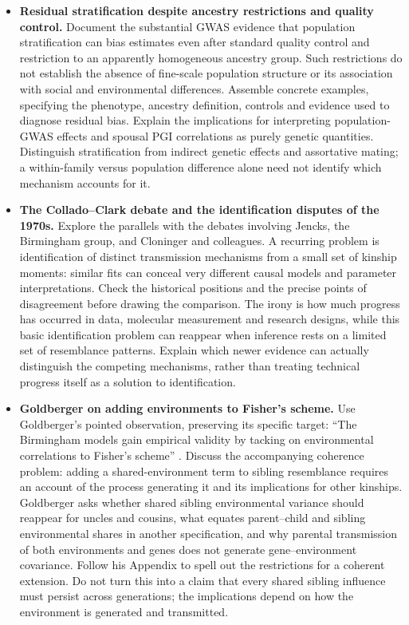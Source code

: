 \begin{itemize}
\item \textbf{Residual stratification despite ancestry restrictions and quality control.}
Document the substantial GWAS evidence that population stratification
can bias estimates even after standard quality control and restriction
to an apparently homogeneous ancestry group. Such restrictions do not
establish the absence of fine-scale population structure or its
association with social and environmental differences. Assemble concrete
examples, specifying the phenotype, ancestry definition, controls and
evidence used to diagnose residual bias. Explain the implications for
interpreting population-GWAS effects and spousal PGI correlations as
purely genetic quantities. Distinguish stratification from indirect
genetic effects and assortative mating; a within-family versus population
difference alone need not identify which mechanism accounts for it.

\item \textbf{The Collado--Clark debate and the identification disputes of the 1970s.}
Explore the parallels with the debates involving Jencks, the Birmingham
group, and Cloninger and colleagues. A recurring problem is identification
of distinct transmission mechanisms from a small set of kinship moments:
similar fits can conceal very different causal models and parameter
interpretations. Check the historical positions and the precise points
of disagreement before drawing the comparison. The irony is how much
progress has occurred in data, molecular measurement and research designs,
while this basic identification problem can reappear when inference rests
on a limited set of resemblance patterns. Explain which newer evidence
can actually distinguish the competing mechanisms, rather than treating
technical progress itself as a solution to identification.

\item \textbf{Goldberger on adding environments to Fisher's scheme.}
Use Goldberger's pointed observation, preserving its specific target:
``The Birmingham models gain empirical validity by tacking on environmental
correlations to Fisher's scheme'' \citep[p.~36]{Goldberger1978}.
Discuss the accompanying coherence problem: adding a shared-environment
term to sibling resemblance requires an account of the process generating
it and its implications for other kinships. Goldberger asks whether shared
sibling environmental variance should reappear for uncles and cousins,
what equates parent--child and sibling environmental shares in another
specification, and why parental transmission of both environments and genes
does not generate gene--environment covariance. Follow his Appendix to
spell out the restrictions for a coherent extension. Do not turn this into
a claim that every shared sibling influence must persist across generations;
the implications depend on how the environment is generated and transmitted.


\end{itemize}
